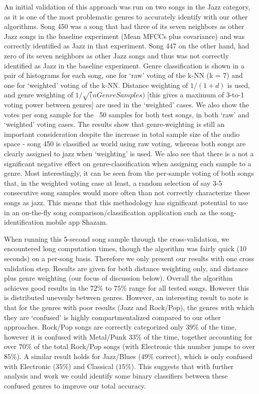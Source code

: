 \documentclass[10pt]{article}
\begin{document}
An initial validation of this approach was run on two songs in the Jazz category, as it is one of the most problematic genres to accurately identify with our other algorithms.  Song 450 was a song that had three of its seven neighbors as other Jazz songs in the baseline experiment (Mean MFCCs plus covariance) and was correctly identified as Jazz in that experiment.  Song 447 on the other hand, had zero of its seven neighbors as other Jazz songs and thus was not correctly identified as Jazz in the baseline experiment.  Genre classification is shown in a pair of histograms for each song, one for ‘raw’ voting of the k-NN (k = 7) and one for ‘weighted’ voting of the k-NN.  Distance weighting of $1 / (1 + d)$ is used, and genre weighting of $1 / \sqrt(nGenreSamples)$ [this gives a maximum of 3-to-1 voting power between genres] are used in the ‘weighted’ cases.   We also show the votes per song sample for the ~50 samples for both test songs, in both ‘raw’ and ‘weighted’ voting cases.  The results show that genre-weighting is still an important consideration despite the increase in total sample size of the audio space - song 450 is classified as world using raw voting, whereas both songs are clearly assigned to jazz when ‘weighting’ is used.  We also see that there is a not a significant negative effect on genre-classification when assigning each sample to a genre.  Most interestingly, it can be seen from the per-sample voting of both songs that, in the weighted voting case at least, a random selection of say 3-5 consecutive song samples would more often than not correctly characterize these songs as jazz.  This means that this methodology has significant potential to use in an on-the-fly song comparison/classification application such as the song-identification mobile app Shazam.


When running this 5-second song sample through the cross-validation, we encountered long computation times, though the algorithm was fairly quick (10 seconds) on a per-song basis.  Therefore we only present our results with one cross validation step.  Results are given for both distance weighting only, and distance plus genre weighting (our focus of discussion below).  Overall the algorithm achieves good results in the $72\%$ to $75\%$ range for all tested songs.  However this is distributed unevenly between genres.  However, an interesting result to note is that for the genres with poor results (Jazz and Rock/Pop), the genres with which they are ‘confused’ is highly compartmentalized compared to our other approaches.  Rock/Pop songs are correctly categorized only $39\%$ of the time, however it is confused with Metal/Punk $33\%$ of the time, together accounting for over $70\%$ of the total Rock/Pop songs (with Electronic this number jumps to over $85\%$).  A similar result holds for Jazz/Blues ($49\%$ correct), which is only confused with Electronic ($35\%$) and Classical ($15\%$).  This suggests that with further analysis and work we could identify some binary classifiers between these confused genres to improve our total accuracy.
\end{document}
